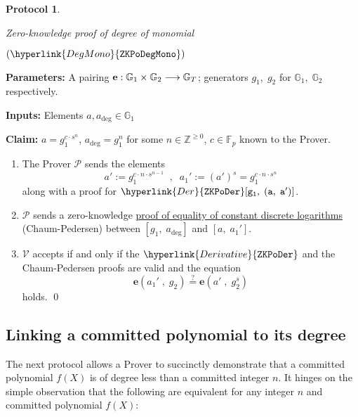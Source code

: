 \documentclass[11pt, lettersize, notitlepage, leqno, footskip=0.6cm]{article}
\newcommand{\bz}{\mathbb Z}
\newcommand{\bFp}{\mathbb{F}_p}
\newcommand{\lra}{\longrightarrow}
\newcommand{\mc}{\mathcal}
\newcommand{\mb}{\mathbb}
\newcommand{\mbf}{\mathbf}
\newcommand{\mP}{\mc{P}}
\newcommand{\V}{\mc{V}}
\newcommand{\vs}{\vspace{-0.15cm}}
\newcommand{\noin}{\noindent}
\newcommand{\sta}{\stackrel{?}{=}}
\newcommand{\e}{\mbf{e}}
\newtheorem{Prot}[Thm]{Protocol}
\numberwithin{equation}{section}
\begin{document}
\bigskip

\begin{mdframed}
\begin{Prot} \hypertarget{DegMono}{Zero-knowledge proof of degree of monomial} $(\hyperlink{DegMono}{\tt{ZKPoDegMono}})$ \end{Prot}  

\noin \textbf{Parameters:} A pairing ${\bf{e}}:\mb{G}_1\times \mb{G}_2\lra \mb{G}_T$; generators $g_1,\;g_2$ for $\mb{G}_1,\; \mb{G}_2$ respectively.


\noindent \textbf{Inputs:} Elements $a, a_{\deg}\in \mb{G}_1$

\noindent \textbf{Claim:} $a = g_1^{c\cdot s^n}$, $a_{\deg} = g_1^n$ for some $n\in \bz^{\geq 0}$, $c\in \bFp$ known to the Prover. 

\begin{enumerate}[wide, labelwidth=!, labelindent=0pt, itemsep=-0.2ex]

\item The Prover $\mP$ sends the elements \vs $$a' := g_1^{c\cdot n\cdot s^{n-1}}\;\;,\;\;  a_1':= (a')^s  = g_1^{c\cdot n\cdot s^{n}} $$ along with a proof for $\hyperlink{Der}{\tt{ZKPoDer}}[g_1,\;(a,\;a')]$.


\item $\mP$ sends a zero-knowledge \hyperlink{CP}{proof of equality of constant discrete logarithms} (Chaum-Pedersen) between $[g_1,\;a_{\deg}]$ and $[a,\;a_1']$.


\item $\V$ accepts if and only if the $\hyperlink{Derivative}{\tt{ZKPoDer}}$ and the Chaum-Pedersen proofs are valid and the equation \vs $$ \e(a_1'\;,\;g_2)\sta \e(a'\;,\;g_2^s)$$ holds.  \qed \end{enumerate} \end{mdframed}

\bigskip


\subsection{\fontsize{11}{11}\selectfont Linking a committed polynomial to its degree}



The next protocol allows a Prover to succinctly demonstrate that a committed polynomial $f(X)$ is of degree less than a committed integer $n$. It hinges on the simple observation that the following are equivalent for any integer $n$ and committed polynomial $f(X)$:\vspace{2mm}
\end{document}
